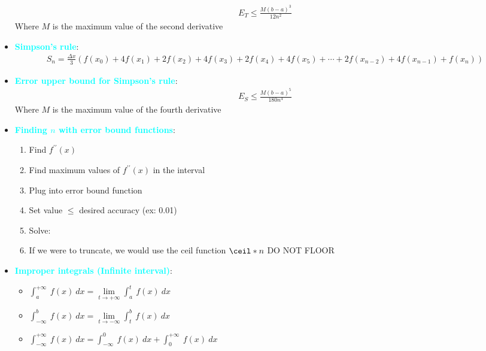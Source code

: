 \documentclass{report}
\begin{document}
\begin{itemize}
            \begin{align*}
                E_{T} \leq \frac{M(b-a)^3}{12n^2}
            \end{align*}
            Where $M$ is the maximum value of the second derivative
        \item \textbf{\textcolor{cyan}{Simpson’s rule}}:
            \begin{align*}
                S_n = \frac{\Delta x}{3} \left( f(x_0) + 4f(x_1) + 2f(x_2) + 4f(x_3) + 2f(x_4) + 4f(x_5) + \cdots + 2f(x_{n-2}) + 4f(x_{n-1}) + f(x_n) \right)
            \end{align*}
        \item \textbf{\textcolor{cyan}{Error upper bound for Simpson’s rule}}:
            \begin{align*}
                E_{S} \leq \frac{M(b-a)^5}{180n^4}
            \end{align*}
            Where $M$ is the maximum value of the fourth derivative
        \item \textbf{\textcolor{cyan}{Finding $n$ with error bound functions}}:
            \begin{enumerate}
                \item Find $f^{\prime\prime}(x)$
                \item Find maximum values of $f^{\prime\prime}(x)$ in the interval
                \item Plug into error bound function 
                \item Set value $\leq$ desired accuracy (ex: 0.01)
                \item Solve: 
                \item If we were to truncate, we would use the ceil function $\ceil*{n}$ DO NOT FLOOR
            \end{enumerate}
        \item \textbf{\textcolor{cyan}{Improper integrals (Infinite interval)}}:
            \begin{itemize}
                \item $\int_{a}^{+\infty}\ f(x)\ dx  = \lim\limits_{t \to +\infty}{\int_{a}^{t}\ f(x)\ dx}$  
                \item $\int_{-\infty}^{b}\ f(x)\ dx = \lim\limits_{t \to -\infty}{\int_{t}^{b}\ f(x)\ dx}$ 
                \item $\int_{-\infty}^{+\infty}\ f(x)\ dx = \int_{-\infty}^{0}\ f(x)\ dx + \int_{0}^{+\infty}\ f(x)\ dx$
            \end{itemize}

\end{itemize}
\end{document}
